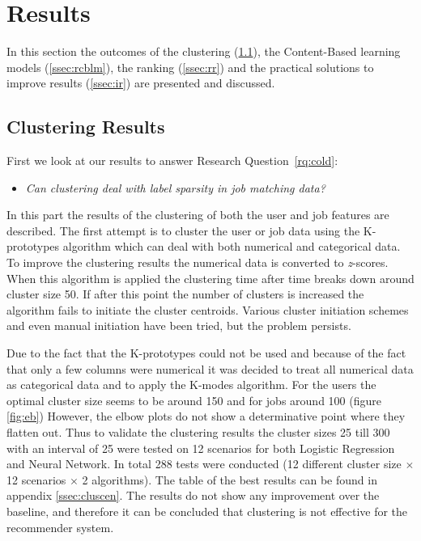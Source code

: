\section{Results}
\label{sec:rslts}

In this section the outcomes of the clustering (\ref{ssec:clures}), the Content-Based learning models (\ref{ssec:rcblm}), the ranking (\ref{ssec:rr}) and the practical solutions to improve results (\ref{ssec:ir}) are presented and discussed.

\subsection{Clustering Results}
\label{ssec:clures}

First we look at our results to answer Research Question~\ref{rq:cold}:
\begin{itemize}
	\item[] \em Can clustering deal with label sparsity in job matching data?
\end{itemize}

\noindent In this part the results of the clustering of both the user and job features are described.
The first attempt is to cluster the user or job data using the K-prototypes algorithm which can deal with both numerical and categorical data.
To improve the clustering results the numerical data is converted to \textit{z}-scores.
When this algorithm is applied the clustering time after time breaks down around cluster size 50. If after this point the number of clusters is increased the algorithm fails to initiate the cluster centroids.
Various cluster initiation schemes and even manual initiation have been tried, but the problem persists.

Due to the fact that the K-prototypes could not be used and because of the fact that only a few columns were numerical it was decided to treat all numerical data as categorical data and to apply the K-modes algorithm.
For the users the optimal cluster size seems to be around 150 and for jobs around 100 (figure \ref{fig:eb})
However, the elbow plots do not show a determinative point where they flatten out.
Thus to validate the clustering results the cluster sizes 25 till 300 with an interval of 25 were tested on 12 scenarios for both Logistic Regression and Neural Network.
In total 288 tests were conducted (12 different cluster size $\times$ 12 scenarios $\times$ 2 algorithms). 
The table of the best results can be found in appendix \ref{ssec:cluscen}.
The results do not show any improvement over the baseline, and therefore it can be concluded that clustering is not effective for the recommender system.

